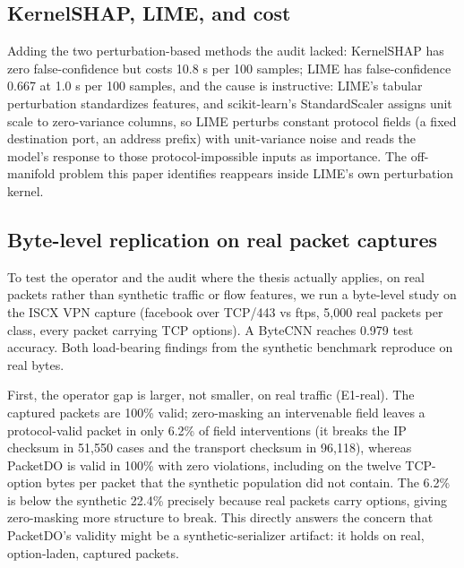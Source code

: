 \documentclass[journal]{IEEEtran}
\begin{document}
\subsection{KernelSHAP, LIME, and cost}

Adding the two perturbation-based methods the audit lacked: KernelSHAP
has zero false-confidence but costs 10.8 s per 100 samples; LIME has
false-confidence 0.667 at 1.0 s per 100 samples, and the cause is
instructive: LIME's tabular perturbation standardizes features, and
scikit-learn's StandardScaler assigns unit scale to zero-variance
columns, so LIME perturbs constant protocol fields (a fixed destination
port, an address prefix) with unit-variance noise and reads the model's
response to those protocol-impossible inputs as importance. The
off-manifold problem this paper identifies reappears inside LIME's own
perturbation kernel.

\subsection{Byte-level replication on real packet captures}

To test the operator and the audit where the thesis actually applies, on
real packets rather than synthetic traffic or flow features, we run a
byte-level study on the ISCX VPN capture (facebook over TCP/443 vs ftps,
5,000 real packets per class, every packet carrying TCP options). A
ByteCNN reaches 0.979 test accuracy. Both load-bearing findings from the
synthetic benchmark reproduce on real bytes.

First, the operator gap is larger, not smaller, on real traffic
(E1-real). The captured packets are 100\% valid; zero-masking an
intervenable field leaves a protocol-valid packet in only 6.2\% of field
interventions (it breaks the IP checksum in 51,550 cases and the
transport checksum in 96,118), whereas PacketDO is valid in 100\% with
zero violations, including on the twelve TCP-option bytes per packet
that the synthetic population did not contain. The 6.2\% is below the
synthetic 22.4\% precisely because real packets carry options, giving
zero-masking more structure to break. This directly answers the concern
that PacketDO's validity might be a synthetic-serializer artifact: it
holds on real, option-laden, captured packets.
\end{document}
